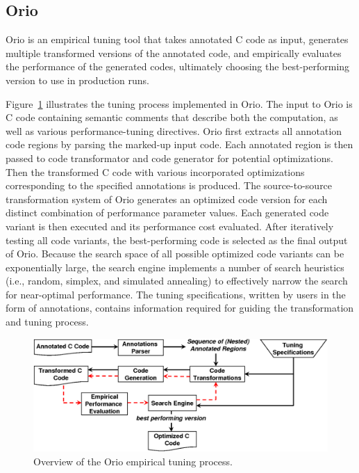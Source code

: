 \documentclass[runningheads]{llncs}
\begin{document}
\subsection{Orio}
\label{sec:orio}

Orio\cite{Norris:2007,Hartono:IPDPS09} is an empirical tuning tool that takes
annotated C code as input, generates multiple transformed versions of the
annotated code, and empirically evaluates the performance of the generated
codes, ultimately choosing the best-performing version to use in production
runs.

Figure~\ref{fig:orio} illustrates the tuning process implemented in
Orio. The input to Orio is C code containing semantic comments that
describe both the computation, as well as various performance-tuning
directives. Orio first extracts all annotation code regions by parsing
the marked-up input code. Each annotated region is then passed to code
transformator and code generator for potential optimizations. Then the
transformed C code with various incorporated optimizations
corresponding to the specified annotations is produced. The
source-to-source transformation system of Orio generates an optimized
code version for each distinct combination of performance parameter
values. Each generated code variant is then executed and its
performance cost evaluated. After iteratively testing all code
variants, the best-performing code is selected as the final output of
Orio. Because the search space of all possible optimized code variants
can be exponentially large, the search engine implements a number of
search heuristics (i.e., random, simplex, and simulated annealing) to
effectively narrow the search for near-optimal performance. The tuning
specifications, written by users in the form of annotations, contains
information required for guiding the transformation and tuning
process.

\begin{figure}[tb]
\vspace{-.3in}
\begin{center}
\includegraphics[width=.65\textwidth]{figures/orio.png}
\end{center}
\vspace{-.25in}
\caption{Overview of the Orio empirical tuning process.}
\label{fig:orio}
\vspace{-.2in}
\end{figure}
\end{document}
